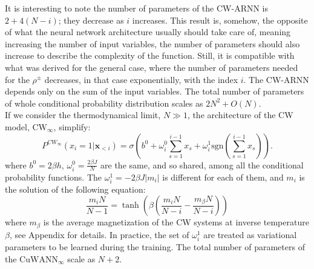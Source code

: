 \documentclass[aps,physrev,10pt,floatfix,reprint]{revtex4-2}
\begin{document}
It is interesting to note the number of parameters of the CW-ARNN is $2+4(N-i)$; they decrease as $i$ increases. This result is, somehow, the opposite of what the neural network architecture usually should take care of, meaning increasing the number of input variables, the number of parameters should also increase to describe the complexity of the function. Still, it is compatible with what was derived for the general case, where the number of parameters needed for the $\rho^{\pm}$ decreases, in that case exponentially, with the index $i$. The CW-ARNN depends only on the sum of the input variables.
The total number of parameters of whole conditional probability distribution scales as $2N^2+ O(N)$. \\
If we consider the thermodynamical limit, $N \gg 1$, the architecture of the CW model, $\text{CW}_{\infty}$, simplify:
\begin{equation*}
    P^{CW_{\infty}}\left(x_{i}=1|\mathbf{x}_{<i}\right) =  \sigma \left(b^0+\omega_{i}^0\sum_{s=1}^{i-1}x_{s} + \omega_i^1 \text{sgn}(\sum_{s=1}^{i-1}x_{s})\right).
\end{equation*}
where $b^0=2\beta h$, $\omega^0_i = \frac{2\beta J}{N}$ are the same, and so shared, among all the conditional probability functions. The $\omega^1_i = -2\beta J |m_i|$ is different for each of them, and $m_i$ is the solution of the following equation:
\begin{equation}
    \frac{m_i N}{N-1} = \tanh \left( \beta(\frac{m_i N}{N - i} - \frac{m_{\beta}N}{N-i}) \right)
    \label{eq:extrem_i}
    \end{equation}
where $m_{\beta}$ is the average magnetization of the CW systems at inverse temperature $\beta$, see Appendix for details. In practice, the set of $\omega^1_i$ are treated as variational parameters to be learned during the training. The total number of parameters of the $\text{CuWANN}_{\infty}$ scale as $N+2$.
    
\end{document}
